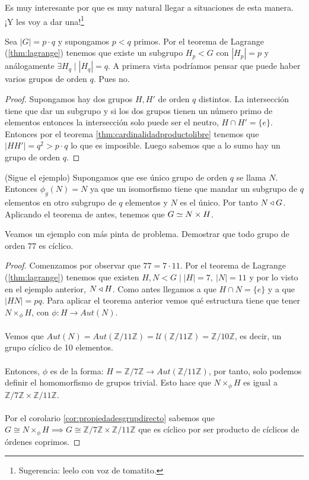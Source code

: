 Es muy interesante por que es muy natural llegar a situaciones de esta manera. ¡Y les voy a dar una!\footnote{Sugerencia: leelo con voz de tomatito.}

\begin{ej}
	Sea $|G| = p \cdot q$ y supongamos $p < q$ primos. Por el teorema de Lagrange (\ref{thm:lagrange}) tenemos que existe un subgrupo $H_p < G$ con $|H_p| = p$ y análogamente $\exists H_q \mid |H_q| = q$. A primera vista podríamos pensar que puede haber varios grupos de orden $q$. Pues no.
\end{ej}

\begin{proof}
	Supongamos hay dos grupos $H, H'$ de orden $q$ distintos. La intersección tiene que dar un subgrupo y si los dos grupos tienen un número primo de elementos entonces la intersección solo puede ser el neutro, $H \cap H' = \{e\}$. Entonces por el teorema \ref{thm:cardinalidadproductolibre} tenemos que $|HH'| = q^2 > p\cdot q$ lo que es imposible. Luego sabemos que a lo sumo hay un grupo de orden $q$.
\end{proof}

(Sigue el ejemplo) Supongamos que ese único grupo de orden $q$ se llama $N$. Entonces $\phi_g(N) = N$ ya que un isomorfismo tiene que mandar un subgrupo de $q$ elementos en otro subgrupo de $q$ elementos y $N$ es el único. Por tanto $N \mathbin{\triangleleft} G$. Aplicando el teorema de antes, tenemos que $G \simeq N \times H$.

\begin{ej}
	Veamos un ejemplo con más pinta de problema. Demostrar que todo grupo de orden $77$ es cíclico.
\end{ej}

\begin{proof}
	Comenzamos por observar que $77 = 7 \cdot 11$. Por el teorema de Lagrange (\ref{thm:lagrange}) tenemos que existen $H, N < G \mid |H| = 7,\ |N| = 11$ y por lo visto en el ejemplo anterior, $N \mathbin{\triangleleft} H$. Como antes llegamos a que $H \cap N = \{e\}$ y a que $|H N| = pq$. Para aplicar el teorema anterior vemos qué estructura tiene que tener $N \times_\phi H$, con $\phi:H\longrightarrow Aut(N)$.
	\\\\
	Vemos que $Aut(N) = Aut(\mathbb{Z}/11\mathbb{Z}) = \mathcal{U}(\mathbb{Z}/11\mathbb{Z}) = \mathbb{Z}/10\mathbb{Z}$, es decir, un grupo cíclico de 10 elementos.
	\\\\
	Entonces, $\phi$ es de la forma: $H = \mathbb{Z}/7\mathbb{Z} \longrightarrow Aut(\mathbb{Z}/11\mathbb{Z})$, por tanto, solo podemos definir el homomorfismo de grupos trivial. Esto hace que $N \times_\phi H$ es igual a $\mathbb{Z}/7\mathbb{Z} \times \mathbb{Z}/11\mathbb{Z}$.\\\\Por el corolario \ref{cor:propiedadesgrupdirecto} sabemos que $G \cong N \times_\phi H \implies G\cong \mathbb{Z}/7\mathbb{Z} \times \mathbb{Z}/11\mathbb{Z}$ que es cíclico por ser producto de cíclicos de órdenes coprimos.
\end{proof}